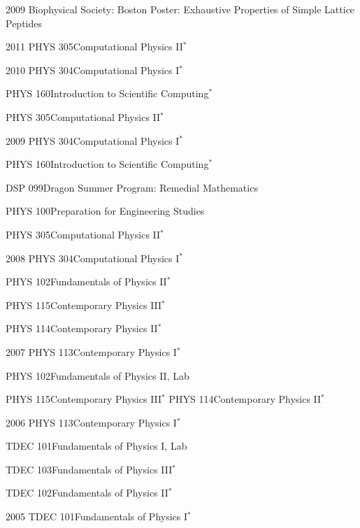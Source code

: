 \documentclass[]{scrartcl}
\begin{document}
\begin{cleanCV}
\WorkExperienceX
{2009}
{Biophysical Society: Boston}
{Poster: Exhaustive Properties of Simple Lattice Peptides}

\pagebreak




\newcommand{\TeachingNote}{$^*$}

\Teaching
{2011}
{PHYS 305}{Computational Physics II\TeachingNote}

\Teaching
{2010}
{PHYS 304}{Computational Physics I\TeachingNote}

\Teaching
{}
{PHYS 160}{Introduction to Scientific Computing\TeachingNote}

\Teaching
{}
{PHYS 305}{Computational Physics II\TeachingNote}

\Teaching
{2009}
{PHYS 304}{Computational Physics I\TeachingNote}

\Teaching
{}
{PHYS 160}{Introduction to Scientific Computing\TeachingNote}

\Teaching
{}
{DSP 099}{Dragon Summer Program: Remedial Mathematics}

\Teaching
{}
{PHYS 100}{Preparation for Engineering Studies}


\Teaching
{}
{PHYS 305}{Computational Physics II\TeachingNote}

\Teaching
{2008}
{PHYS 304}{Computational Physics I\TeachingNote}

\Teaching
{}
{PHYS 102}{Fundamentals of Physics II\TeachingNote}

\Teaching
{}
{PHYS 115}{Contemporary Physics III\TeachingNote}

\Teaching
{}
{PHYS 114}{Contemporary Physics II\TeachingNote}

\Teaching
{2007}
{PHYS 113}{Contemporary Physics I\TeachingNote}

\Teaching
{}
{PHYS 102}{Fundamentals of Physics II, Lab}

\Teaching
{}
{PHYS 115}{Contemporary Physics III\TeachingNote}
\Teaching
{}
{PHYS 114}{Contemporary Physics II\TeachingNote}

\Teaching
{2006}
{PHYS 113}{Contemporary Physics I\TeachingNote}

\Teaching
{}
{TDEC 101}{Fundamentals of Physics I, Lab}

\Teaching
{}
{TDEC 103}{Fundamentals of Physics III\TeachingNote}

\Teaching
{}
{TDEC 102}{Fundamentals of Physics II\TeachingNote}

\Teaching
{2005}
{TDEC 101}{Fundamentals of Physics I\TeachingNote}


\end{cleanCV}
\end{document}
